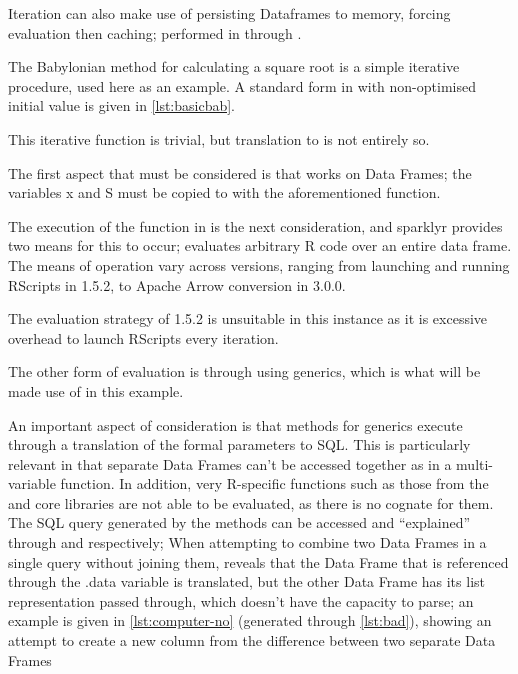 Iteration can also make use of persisting  Dataframes to memory, forcing evaluation then caching; performed in  through .

The Babylonian method for calculating a square root is a simple iterative procedure, used here as an example.
A standard form in \R{} with non-optimised initial value is given in \cref{lst:basicbab}.


This iterative function is trivial, but translation to  is not entirely so.

The first aspect that must be considered is that  works on  Data Frames; the variables x and S must be copied to  with the aforementioned  function.

The execution of the function in  is the next consideration, and sparklyr provides two means for this to occur;  evaluates arbitrary R code over an entire data frame.
The means of operation vary across  versions, ranging from launching and running RScripts in  1.5.2, to Apache Arrow conversion in  3.0.0.

The evaluation strategy of 1.5.2 is unsuitable in this instance as it is excessive overhead to launch RScripts every iteration.

The other form of evaluation is through using  generics, which is what will be made use of in this example.

An important aspect of consideration is that  methods for  generics execute through a translation of the formal parameters to  SQL.
This is particularly relevant in that separate  Data Frames can't be accessed together as in a multi-variable function.
In addition, very R-specific functions such as those from the  and  core libraries are not able to be evaluated, as there is no  cognate for them.
The SQL query generated by the methods can be accessed and ``explained'' through  and  respectively; When attempting to combine two  Data Frames in a single query without joining them,  reveals that the Data Frame that is referenced through the .data variable is translated, but the other Data Frame has its list representation passed through, which  doesn't have the capacity to parse; an example is given in \cref{lst:computer-no} (generated through \cref{lst:bad}), showing an attempt to create a new column from the difference between two separate Data Frames

